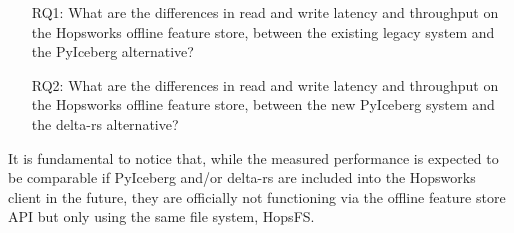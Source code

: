 \begin{enumerate}
    \item[RQ1:] What are the differences in read and write latency and throughput on the Hopsworks offline feature store, between the existing legacy system and the PyIceberg alternative?
    \item[RQ2:] What are the differences in read and write latency and throughput on the Hopsworks offline feature store, between the new PyIceberg system and the delta-rs alternative?
\end{enumerate}

It is fundamental to notice that, while the measured performance is expected to be comparable if PyIceberg and/or delta-rs are included into the Hopsworks client in the future, they are officially not functioning via the offline feature store \gls{API} but only using the same file system, \gls{HopsFS}.
